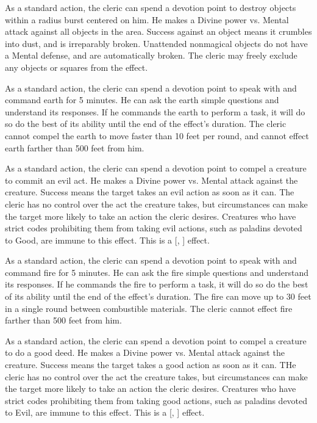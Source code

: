 As a standard action, the cleric can spend a devotion point to destroy objects within a \arealarge radius burst centered on him.
He makes a Divine power vs. Mental attack against all objects in the area.
Success against an object means it crumbles into dust, and is irreparably broken.
Unattended nonmagical objects do not have a Mental defense, and are automatically broken.
The cleric may freely exclude any objects or squares from the effect.

As a standard action, the cleric can spend a devotion point to speak with and command earth for 5 minutes.
He can ask the earth simple questions and understand its responses.
If he commands the earth to perform a task, it will do so do the best of its ability until the end of the effect's duration.
The cleric cannot compel the earth to move faster than 10 feet per round, and cannot effect earth farther than 500 feet from him.

As a standard action, the cleric can spend a devotion point to compel a creature to commit an evil act.
He makes a Divine power vs. Mental attack against the creature.
Success means the target takes an evil action as soon as it can.
The cleric has no control over the act the creature takes, but circumstances can make the target more likely to take an action the cleric desires.
Creatures who have strict codes prohibiting them from taking evil actions, such as paladins devoted to Good, are immune to this effect.
This is a [, ] effect.

As a standard action, the cleric can spend a devotion point to speak with and command fire for 5 minutes.
He can ask the fire simple questions and understand its responses.
If he commands the fire to perform a task, it will do so do the best of its ability until the end of the effect's duration.
The fire can move up to 30 feet in a single round between combustible materials.
The cleric cannot effect fire farther than 500 feet from him.

As a standard action, the cleric can spend a devotion point to compel a creature to do a good deed.
He makes a Divine power vs. Mental attack against the creature.
Success means the target takes a good action as soon as it can.
THe cleric has no control over the act the creature takes, but circumstances can make the target more likely to take an action the cleric desires.
Creatures who have strict codes prohibiting them from taking good actions, such as paladins devoted to Evil, are immune to this effect.
This is a [, ] effect.

